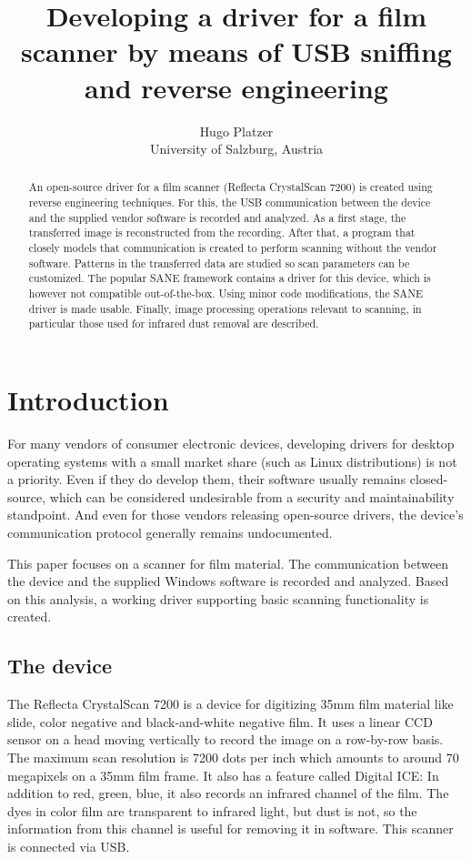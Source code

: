 \documentclass{article}
\begin{document}
\title{Developing a driver for a film scanner by means of USB sniffing and reverse engineering}
\author{Hugo Platzer \\ University of Salzburg, Austria}
\maketitle

\begin{abstract}
An open-source driver for a film scanner (Reflecta CrystalScan 7200) is created using
reverse engineering techniques. For this, the USB communication between the device and
the supplied vendor software is recorded and analyzed. As a first stage, the transferred
image is reconstructed from the recording.  After that, a program that closely models
that communication is created to perform scanning without the vendor software.
Patterns in the transferred data are studied so scan parameters can be customized.
The popular SANE framework contains a driver for this device,
which is however not compatible out-of-the-box.
Using minor code modifications, the SANE driver is made usable.
Finally, image processing operations relevant to scanning,
in particular those used for infrared dust removal are described.
\end{abstract}

\section{Introduction}

For many vendors of consumer electronic devices,
developing drivers for desktop operating systems
with a small market share (such as Linux distributions) is not a priority. Even if
they do develop them, their software usually remains closed-source, which can be considered
undesirable from a security and maintainability standpoint. And even for those
vendors releasing open-source drivers, the device's communication protocol generally remains
undocumented.

This paper focuses on a scanner for film material. The communication between the
device and the supplied Windows software is recorded and analyzed. Based on this analysis,
a working driver supporting basic scanning functionality is created.

\subsection{The device}

The Reflecta CrystalScan 7200 is a device for digitizing 35mm film material like
slide, color negative and black-and-white negative film.
It uses a linear CCD sensor on a head moving vertically to record the image on a row-by-row basis.
The maximum scan resolution is 7200 dots per inch which amounts to around 70 megapixels
on a 35mm film frame. It also has a feature called Digital ICE: In addition to red, green, blue, it also
records an infrared channel of the film. The dyes in color film are transparent to infrared light,
but dust is not, so the information from this channel is useful for removing it in software.
This scanner is connected via USB. \cite{rcs} \cite{rcs_review}
\end{document}
